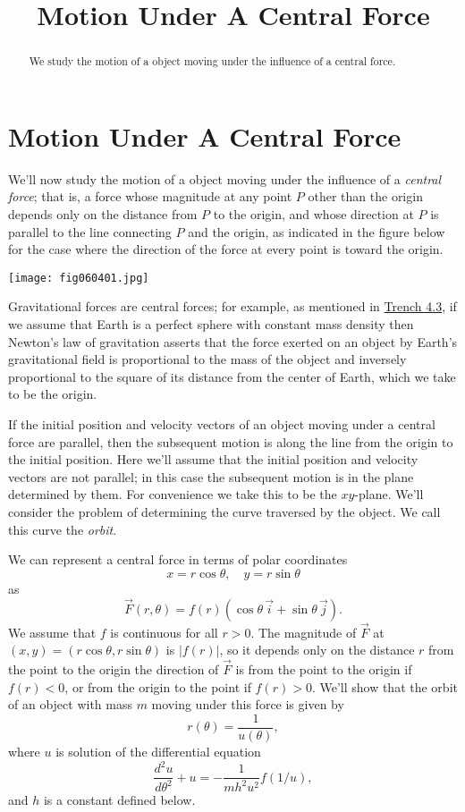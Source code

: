 \documentclass{ximera}
\title{Motion Under A Central Force}%
\begin{document}
\begin{abstract}
We study the motion of a object moving under the influence
of a central force.
\end{abstract}

\maketitle

\section*{Motion Under A Central Force}

We'll now study the motion of a object moving under the influence
of a \textit{central force}; that is, a force whose magnitude at any
point $P$ other than the origin depends only on the distance from
$P$ to the origin, and whose direction at $P$ is parallel to the line
connecting $P$ and the origin, as indicated in
the figure below for the case where the direction of the force
at every point is toward the origin.

\begin{image}
 \texttt{[image: fig060401.jpg]}
 \end{image}

 Gravitational forces are central
forces;   for example, as mentioned in \href{https://ximera.osu.edu/ode/main/secondLawOfMotion/secondLawOfMotion}{Trench 4.3}, if we
assume that Earth is a perfect sphere with constant mass density then
Newton's law of gravitation asserts that the force exerted on an
object by Earth's gravitational field is proportional to the mass of
the object and inversely proportional to the square of its distance
from the center of Earth, which we take to be the origin.

If the initial position and velocity vectors of an object moving under
a central force are parallel, then the subsequent motion is along the
line from the origin to the initial position. Here we'll assume that
the initial position and velocity vectors are not parallel;   in this
case the subsequent motion is in the plane determined by them. For
convenience we take this to be the $xy$-plane. We'll
consider
the problem of determining the curve traversed by the object. We call
this curve the \textit{orbit}.


We can represent a central force in terms of polar coordinates
$$
x=r\cos\theta,\quad y=r\sin\theta
$$
 as
$$
\vec{F}(r,\theta)=f(r)(\cos\theta\,\vec{i}+\sin\theta\,\vec{j}).
$$
We assume that $f$ is continuous for all $r>0$. The magnitude of $\vec{F}$ at $(x,y)=(r\cos\theta,r\sin\theta)$ is $|f(r)|$, so it depends
only on the distance $r$ from the point to the origin   the direction
of $\vec{F}$ is from the point to the origin if $f(r)<0$, or from the
origin to the point if $f(r)>0$. We'll show that the orbit of an
object with mass $m$ moving under this force is given by
$$
r(\theta)=\frac{1}{u(\theta)},
$$
where $u$  is solution of the differential equation
\begin{equation} \label{eq:6.4.1}
 \frac{d^2u}{d\theta^2}+u=-\frac{1}{mh^2u^2}f(1/u),
\end{equation}
and $h$ is a constant defined below.
\end{document}
